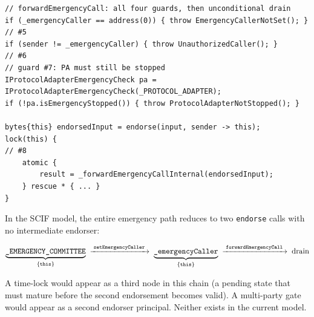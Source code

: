\documentclass[11pt,a4paper]{article}
\begin{document}
\begin{lstlisting}[style=scifstyle,caption={Fund drain path: emergency caller with unrestricted input.}]
// forwardEmergencyCall: all four guards, then unconditional drain
if (_emergencyCaller == address(0)) { throw EmergencyCallerNotSet(); }  // #5
if (sender != _emergencyCaller) { throw UnauthorizedCaller(); }         // #6
// guard #7: PA must still be stopped
IProtocolAdapterEmergencyCheck pa = IProtocolAdapterEmergencyCheck(_PROTOCOL_ADAPTER);
if (!pa.isEmergencyStopped()) { throw ProtocolAdapterNotStopped(); }

bytes{this} endorsedInput = endorse(input, sender -> this);
lock(this) {                                                            // #8
    atomic {
        result = _forwardEmergencyCallInternal(endorsedInput);
    } rescue * { ... }
}
\end{lstlisting}

In the SCIF model, the entire emergency path reduces to two
\texttt{endorse} calls with no intermediate endorser:

\[
  \underbrace{\texttt{\_EMERGENCY\_COMMITTEE}}_{\{\texttt{this}\}}
  \;\xrightarrow{\;\texttt{set\-Emergency\-Caller}\;}\;
  \underbrace{\texttt{\_emergencyCaller}}_{\{\texttt{this}\}}
  \;\xrightarrow{\;\texttt{forward\-Emergency\-Call}\;}\;
  \text{drain}
\]

A time-lock would appear as a third node in this chain (a pending
state that must mature before the second endorsement becomes valid).
A multi-party gate would appear as a second endorser principal.
Neither exists in the current model.
\end{document}

